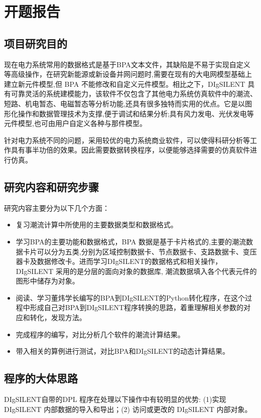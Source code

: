 \chapter{开题报告}

\section{项目研究目的}
现在电力系统常用的数据格式是基于BPA文本文件，其缺陷是不易于实现自定义等高级操作，在研究新能源或新设备并网问题时,需要在现有的大电网模型基础上建立新元件模型,但 BPA 不能修改和自定义元件模型。相比之下，DIgSILENT 具有可靠灵活的系统建模能力，该软件不仅包含了其他电力系统仿真软件中的潮流、短路、机电暂态、电磁暂态等分析功能,还具有很多独特而实用的优点。它是以图形化操作和数据管理技术为支撑,便于调试和结果分析;具有风力发电、光伏发电等元件模型,也可由用户自定义各种与那件模型。

针对电力系统不同的问题，采用较优的电力系统商业软件，可以使得科研分析等工作具有事半功倍的效果。因此需要数据转换程序，以便能够选择需要的仿真软件进行仿真。

\section{研究内容和研究步骤}
研究内容主要分为以下几个方面：

\begin{itemize}
\item 复习潮流计算中所使用的主要数据类型和数据格式。
\item 学习BPA的主要功能和数据格式，BPA 数据是基于卡片格式的,主要的潮流数据卡片可以分为五类,分别为区域控制数据卡、节点数据卡、支路数据卡、变压器卡及数据修改卡。进而学习DIgSILENT的数据格式和相关操作，DIgSILENT 采用的是分层的面向对象的数据库, 潮流数据填入各个代表元件的图形中储存为对象。
\item 阅读、学习董炜学长编写的BPA到DIgSILENT的Python转化程序，在这个过程中形成自己对BPA到DIgSILENT程序转换的思路，着重理解相关参数的对应和转化，发现方法。
\item 完成程序的编写，对比分析几个软件的潮流计算结果。
\item 带入相关的算例进行测试，对比BPA和DIgSILENT的动态计算结果。
\end{itemize}

\section{程序的大体思路}

DIgSILENT自带的DPL 程序在处理以下操作中有较明显的优势: (1)实现 DIgSILENT 内部数据的导入和导出；(2) 访问或更改的 DIgSILENT 内部对象。

